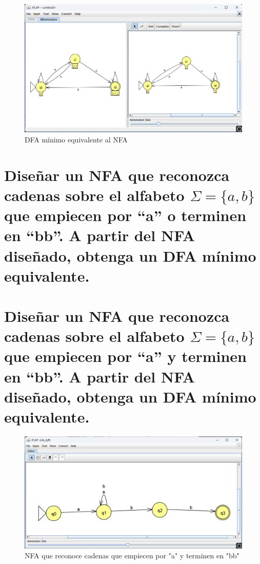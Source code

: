 \documentclass[11pt]{report}
\begin{document}
\begin{figure}[H]
  \centering
  \includegraphics[scale=0.4]{img/DFA_to_DFA_minimized_02.png}
  \caption{DFA mínimo equivalente al NFA}
\end{figure}

\newpage

\section{Diseñar un NFA que reconozca cadenas sobre el alfabeto $\Sigma = \{a, b\}$ que empiecen por “a” o terminen en “bb”. A partir del NFA diseñado, obtenga un DFA mínimo equivalente.}

\newpage

\section{Diseñar un NFA que reconozca cadenas sobre el alfabeto $\Sigma = \{a, b\}$ que empiecen por “a” y terminen en “bb”. A partir del NFA diseñado, obtenga un DFA mínimo equivalente.}
\begin{figure}[H]
  \centering
  \includegraphics[scale=0.6]{img/NFA_04.png}
  \caption{NFA que reconoce cadenas que empiecen por "a" y terminen en "bb"}
\end{figure}
\end{document}
